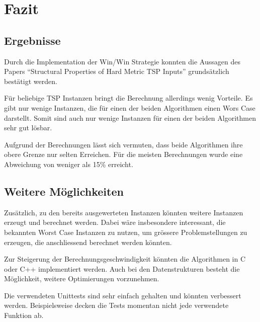 \documentclass[11pt,a4paper]{article}
\begin{document}
\section{Fazit}
\subsection{Ergebnisse}
Durch die Implementation der Win/Win Strategie konnten die Aussagen des Papers "`Structural Properties of Hard Metric TSP Inputs"'\cite{moemke11} grundsätzlich bestätigt werden. 

Für beliebige TSP Instanzen bringt die Berechnung allerdings wenig Vorteile. Es gibt nur wenige Instanzen, die für einen der beiden Algorithmen einen Wors Case darstellt. Somit sind auch nur wenige Instanzen für einen der beiden Algorithmen sehr gut lösbar.

Aufgrund der Berechnungen lässt sich vermuten, dass beide Algorithmen ihre obere Grenze nur selten Erreichen. Für die meisten Berechnungen wurde eine Abweichung von weniger als 15\% erreicht.

\subsection{Weitere Möglichkeiten}
Zusätzlich, zu den bereits ausgewerteten Instanzen könnten weitere Instanzen erzeugt und berechnet werden. Dabei wäre insbesondere interessant, die bekannten Worst Case Instanzen zu nutzen, um grössere Problemstellungen zu erzeugen, die anschliessend berechnet werden könnten.

Zur Steigerung der Berechnungsgeschwindigkeit könnten die Algorithmen in C oder C++ implementiert werden. Auch bei den Datenstrukturen besteht die Möglichkeit, weitere Optimierungen vorzunehmen.

Die verwendeten Unittests sind sehr einfach gehalten und könnten verbessert werden. Beispielsweise decken die Tests momentan nicht jede verwendete Funktion ab.

\newpage



\end{document}
